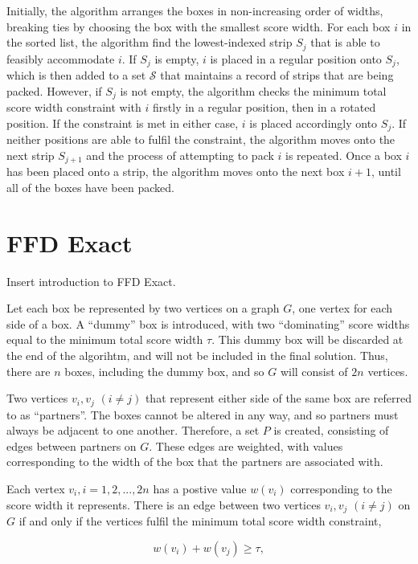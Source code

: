 \documentclass[oribibl]{llncs}
\begin{document}
Initially, the algorithm arranges the boxes in non-increasing order of widths, breaking ties by choosing the box with the smallest score width. For each box $i$ in the sorted list, the algorithm find the lowest-indexed strip $S_j$ that is able to feasibly accommodate $i$. If $S_j$ is empty, $i$ is placed in a regular position onto $S_j$, which is then added to a set $\mathcal{S}$ that maintains a record of strips that are being packed. However, if $S_j$ is not empty, the algorithm checks the minimum total score width constraint with $i$ firstly in a regular position, then in a rotated position. If the constraint is met in either case, $i$ is placed accordingly onto $S_j$. If neither positions are able to fulfil the constraint, the algorithm moves onto the next strip $S_{j+1}$ and the process of attempting to pack $i$ is repeated. Once a box $i$ has been placed onto a strip, the algorithm moves onto the next box $i+1$, until all of the boxes have been packed. 


\section{FFD Exact}

Insert introduction to FFD Exact.

Let each box be represented by two vertices on a graph $G$, one vertex for each side of a box. A ``dummy'' box is introduced, with two ``dominating'' score widths equal to the minimum total score width $\tau$. This dummy box will be discarded at the end of the algorihtm, and will not be included in the final solution. Thus, there are $n$ boxes, including the dummy box, and so $G$ will consist of $2n$ vertices.

Two vertices $v_i, v_j$ $(i \neq j)$ that represent either side of the same box are referred to as ``partners''. The boxes cannot be altered in any way, and so partners must always be adjacent to one another. Therefore, a set $P$ is created, consisting of edges between partners on $G$. These edges are weighted, with values corresponding to the width of the box that the partners are associated with.

Each vertex $v_i, i = 1, 2, ..., 2n$ has a postive value $w(v_i)$ corresponding to the score width it represents. There is an edge between two vertices $v_i, v_j$ $(i \neq j)$ on $G$ if and only if the vertices fulfil the minimum total score width constraint,

\begin{equation*}
	w(v_i) + w(v_j) \geq \tau,
\end{equation*}
\end{document}
